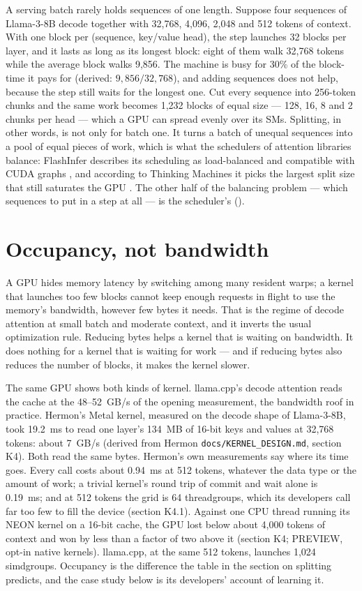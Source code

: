 A serving batch rarely holds sequences of one length. Suppose four sequences of
Llama-3-8B decode together with 32,768, 4,096, 2,048 and 512 tokens of context.
With one block per (sequence, key/value head), the step launches 32 blocks per
layer, and it lasts as long as its longest block: eight of them walk 32,768
tokens while the average block walks 9,856. The machine is busy for 30\% of the
block-time it pays for (derived: $9{,}856 / 32{,}768$), and adding sequences
does not help, because the step still waits for the longest one. Cut every
sequence into 256-token chunks and the same work becomes 1,232 blocks of equal
size --- 128, 16, 8 and 2 chunks per head --- which a GPU can spread evenly over
its SMs. Splitting, in other words, is not only for batch one. It turns a batch
of unequal sequences into a pool of equal pieces of work, which is what the
schedulers of attention libraries balance: FlashInfer describes its scheduling
as load-balanced and compatible with CUDA graphs \cite{ye2025flashinfer}, and
according to Thinking Machines it picks the largest split size that still
saturates the GPU \cite{he2025nondeterminism}. The other half of the balancing
problem --- which sequences to put in a step at all --- is the scheduler's
().

\section{Occupancy, not bandwidth}

A GPU hides memory latency by switching among many resident warps; a kernel
that launches too few blocks cannot keep enough requests in flight to use the
memory's bandwidth, however few bytes it needs. That is the regime of decode
attention at small batch and moderate context, and it inverts the usual
optimization rule. Reducing bytes helps a kernel that is waiting on bandwidth.
It does nothing for a kernel that is waiting for work --- and if reducing bytes
also reduces the number of blocks, it makes the kernel slower.

The same GPU shows both kinds of kernel. llama.cpp's decode attention reads the
cache at the 48--52~GB/s of the opening measurement, the bandwidth roof in
practice. Hermon's Metal kernel, measured on the decode shape of Llama-3-8B,
took 19.2~ms to read one layer's 134~MB of 16-bit keys and values at 32,768
tokens: about 7~GB/s (derived from Hermon \texttt{docs/KERNEL\_DESIGN.md},
section K4). Both read the same bytes. Hermon's own measurements say where its
time goes. Every call costs about 0.94~ms at 512 tokens, whatever the data type
or the amount of work; a trivial kernel's round trip of commit and wait alone
is 0.19~ms; and at 512 tokens the grid is 64 threadgroups, which its developers
call far too few to fill the device (section K4.1). Against one CPU thread
running its NEON kernel on a 16-bit cache, the GPU lost below about 4,000 tokens
of context and won by less than a factor of two above it (section K4; PREVIEW,
opt-in native kernels). llama.cpp, at the same 512 tokens, launches 1,024
simdgroups. Occupancy is the difference the table in the section on splitting
predicts, and the case study below is its developers' account of learning it.

